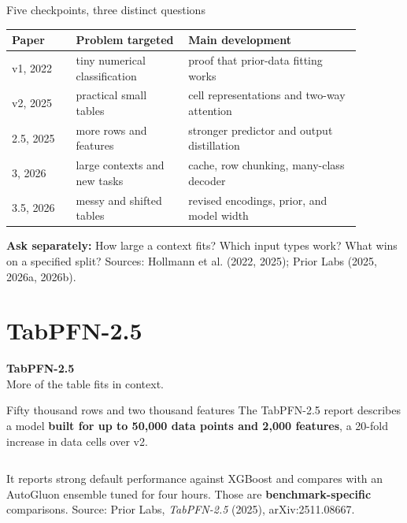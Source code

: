 \documentclass[aspectratio=169]{beamer}
\begin{document}
\begin{frame}{Five checkpoints, three distinct questions}
  \small
  \begin{tabular}{L{0.16\linewidth}L{0.29\linewidth}L{0.43\linewidth}}
    \textbf{Paper} & \textbf{Problem targeted} & \textbf{Main development}\\[3pt]\hline
    v1, 2022 & tiny numerical classification & proof that prior-data fitting works\\[3pt]
    v2, 2025 & practical small tables & cell representations and two-way attention\\[3pt]
    2.5, 2025 & more rows and features & stronger predictor and output distillation\\[3pt]
    3, 2026 & large contexts and new tasks & cache, row chunking, many-class decoder\\[3pt]
    3.5, 2026 & messy and shifted tables & revised encodings, prior, and model width
  \end{tabular}
  \vskip 10pt
  \textbf{Ask separately:} How large a context fits? Which input types work? What wins on a specified split?
  \vskip 5pt
  {\scriptsize Sources: Hollmann et al. (2022, 2025); Prior Labs (2025, 2026a, 2026b).}
\end{frame}

\section{TabPFN-2.5}
\begin{frame}[plain]
  \vfill\centering
  {\Large\color{popblue}\textbf{TabPFN-2.5}}\\[9pt]
  {\small More of the table fits in context.}
  \vfill
\end{frame}

\begin{frame}{Fifty thousand rows and two thousand features}
  \small
  The TabPFN-2.5 report describes a model \textbf{built for up to 50,000 data points and 2,000
  features}, a 20-fold increase in data cells over v2.
  \vskip 10pt
  \begin{columns}[T]
  \end{columns}
  \vskip 10pt
  It reports strong default performance against XGBoost and compares with an AutoGluon
  ensemble tuned for four hours. Those are \textbf{benchmark-specific} comparisons.
  \vskip 4pt
  {\scriptsize Source: Prior Labs, \emph{TabPFN-2.5} (2025), arXiv:2511.08667.}
\end{frame}
\end{document}
